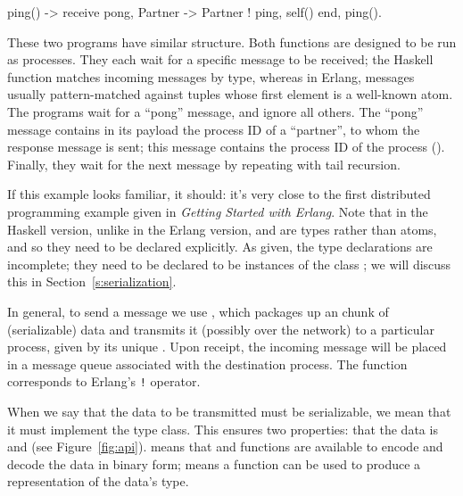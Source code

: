 \documentclass[preprint]{sigplanconf}
\begin{document}
\begin{code}[language=Erlang,caption={Ping in Erlang}]
ping() ->
  receive
    {pong, Partner} -> 
      Partner ! {ping, self()}
  end,
  ping().               
\end{code}

These two programs have similar structure. Both  functions are designed to be run as processes. They each wait for a specific message to be received; the Haskell  function matches incoming messages by type, whereas in Erlang, messages usually pattern-matched against tuples whose first element is a well-known atom. The programs wait for a ``pong'' message, and ignore all others. The ``pong'' message contains in its payload the process ID of a ``partner'', to whom the response message is sent; this message contains the process ID of the  process (). Finally, they wait for the next message by repeating with tail recursion.

If this example looks familiar, it should: it's very close to the first distributed programming example given in {\em Getting Started with Erlang}. Note that in the Haskell version, unlike in the Erlang version,  and  are types rather than atoms, and so they need to be declared explicitly. As given, the type declarations are incomplete; they need to be declared to be instances of the class ; we will discuss this in Section~\ref{s:serialization}.

In general, to send a message we use , which packages up an chunk of (serializable) data and transmits it (possibly over the network) to a particular process, given by its unique . Upon receipt, the incoming message will be placed in a message queue associated with the destination process. 
The  function corresponds to Erlang's \texttt{!} operator.

When we say that the data to be transmitted must be serializable, we mean that it must implement the  type class.  This ensures two properties: that the data is  and  (see Figure~\ref{fig:api}).
 means that  and  functions are available to encode and decode the data in binary form;  means a function  can be used to produce a representation of the data's type.  
\end{document}

